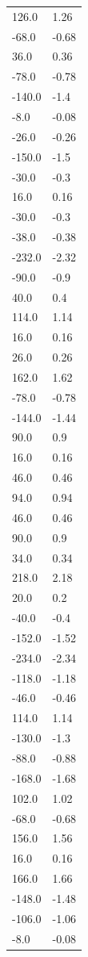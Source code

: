\begin{longtable}{ll}
126.0 & 1.26 \\
-68.0 & -0.68 \\
36.0 & 0.36 \\
-78.0 & -0.78 \\
-140.0 & -1.4 \\
-8.0 & -0.08 \\
-26.0 & -0.26 \\
-150.0 & -1.5 \\
-30.0 & -0.3 \\
16.0 & 0.16 \\
-30.0 & -0.3 \\
-38.0 & -0.38 \\
-232.0 & -2.32 \\
-90.0 & -0.9 \\
40.0 & 0.4 \\
114.0 & 1.14 \\
16.0 & 0.16 \\
26.0 & 0.26 \\
162.0 & 1.62 \\
-78.0 & -0.78 \\
-144.0 & -1.44 \\
90.0 & 0.9 \\
16.0 & 0.16 \\
46.0 & 0.46 \\
94.0 & 0.94 \\
46.0 & 0.46 \\
90.0 & 0.9 \\
34.0 & 0.34 \\
218.0 & 2.18 \\
20.0 & 0.2 \\
-40.0 & -0.4 \\
-152.0 & -1.52 \\
-234.0 & -2.34 \\
-118.0 & -1.18 \\
-46.0 & -0.46 \\
114.0 & 1.14 \\
-130.0 & -1.3 \\
-88.0 & -0.88 \\
-168.0 & -1.68 \\
102.0 & 1.02 \\
-68.0 & -0.68 \\
156.0 & 1.56 \\
16.0 & 0.16 \\
166.0 & 1.66 \\
-148.0 & -1.48 \\
-106.0 & -1.06 \\
-8.0 & -0.08 \\

\end{longtable}
